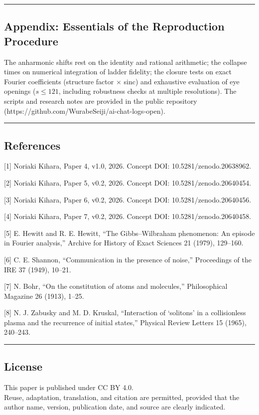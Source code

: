 \documentclass[
]{article}
\begin{document}
\begin{center}\rule{0.5\linewidth}{0.5pt}\end{center}

\subsection{Appendix: Essentials of the Reproduction
Procedure}\label{appendix-essentials-of-the-reproduction-procedure}

The anharmonic shifts rest on the identity and rational arithmetic; the
collapse times on numerical integration of ladder fidelity; the closure
tests on exact Fourier coefficients (structure factor × sinc) and
exhaustive evaluation of eye openings (\(s\le121\), including robustness
checks at multiple resolutions). The scripts and research notes are
provided in the public repository
(https://github.com/WurabeSeiji/ai-chat-logs-open).

\begin{center}\rule{0.5\linewidth}{0.5pt}\end{center}

\subsection{References}\label{references}

{[}1{]} Noriaki Kihara, Paper 4, v1.0, 2026. Concept DOI:
10.5281/zenodo.20638962.

{[}2{]} Noriaki Kihara, Paper 5, v0.2, 2026. Concept DOI: 10.5281/zenodo.20640454.

{[}3{]} Noriaki Kihara, Paper 6, v0.2, 2026. Concept DOI: 10.5281/zenodo.20640456.

{[}4{]} Noriaki Kihara, Paper 7, v0.2, 2026. Concept DOI: 10.5281/zenodo.20640458.

{[}5{]} E. Hewitt and R. E. Hewitt, ``The Gibbs--Wilbraham phenomenon:
An episode in Fourier analysis,'' Archive for History of Exact Sciences
21 (1979), 129--160.

{[}6{]} C. E. Shannon, ``Communication in the presence of noise,''
Proceedings of the IRE 37 (1949), 10--21.

{[}7{]} N. Bohr, ``On the constitution of atoms and molecules,''
Philosophical Magazine 26 (1913), 1--25.

{[}8{]} N. J. Zabusky and M. D. Kruskal, ``Interaction of `solitons' in
a collisionless plasma and the recurrence of initial states,'' Physical
Review Letters 15 (1965), 240--243.

\begin{center}\rule{0.5\linewidth}{0.5pt}\end{center}

\subsection{License}\label{license}

This paper is published under CC BY 4.0.\\
Reuse, adaptation, translation, and citation are permitted, provided
that the author name, version, publication date, and source are clearly
indicated.
\end{document}
